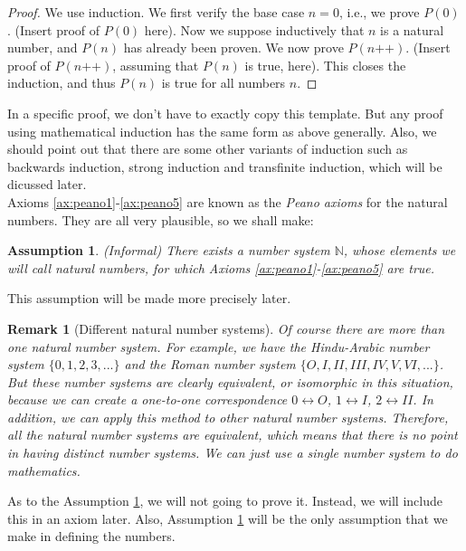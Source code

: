 \documentclass[a4paper,oneside]{book}
\newtheorem*{proof}{\textit{Proof.}}
\newtheorem{assumption}{Assumption}[chapter]
\newtheorem{remark}{Remark}[section]
\begin{document}
			\begin{proof}
				We use induction. We first verify the base case $n=0$, i.e., we prove $P(0)$. (Insert proof of $P(0)$ here). Now we suppose inductively that $n$ is a natural number, and $P(n)$ has already been proven. We now prove $P(n\texttt{++})$. (Insert proof of $P(n \texttt{++})$, assuming that $P(n)$ is true, here). This closes the induction, and thus $P(n)$ is true for all numbers $n$.
			\end{proof}
			In a specific proof, we don't have to exactly copy this template. But any proof using mathematical induction has the same form as above generally. Also, we should point out that there are some other variants of induction such as backwards induction, strong induction and transfinite induction, which will be dicussed later.\\
			Axioms \ref{ax:peano1}-\ref{ax:peano5} are known as the \textit{Peano axioms} for the natural numbers. They are all very plausible, so we shall make:
			\begin{assumption}
				\label{assumption1}
				(Informal) There exists a number system $\mathbb{N}$, whose elements we will call natural numbers, for which Axioms \ref{ax:peano1}-\ref{ax:peano5} are true.
			\end{assumption}
			This assumption will be made more precisely later.
			\begin{remark}[Different natural number systems]
				Of course there are more than one natural number system. For example, we have the Hindu-Arabic number system $\{0,1,2,3,...\}$ and the Roman number system $\{O,I,I\!I,I\!I\!I,I\!V,V,V\!I,...\}$. But these number systems are clearly equivalent, or isomorphic in this situation, because we can create a one-to-one correspondence $0\leftrightarrow O$, $1\leftrightarrow I$, $2\leftrightarrow I\!I$. In addition, we can apply this method to other natural number systems. Therefore, all the natural number systems are equivalent, which means that there is no point in having distinct number systems. We can just use a single number system to do mathematics.
			\end{remark}
			As to the Assumption \ref{assumption1}, we will not going to prove it. Instead, we will include this in an axiom later. Also, Assumption \ref{assumption1} will be the only assumption that we make in defining the numbers.
\end{document}
